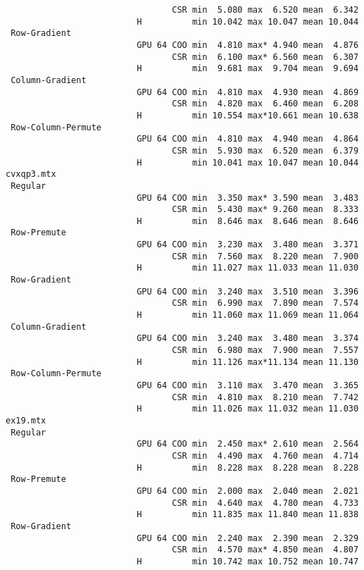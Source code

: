 {\begin{verbatim}
                                 CSR min  5.080 max  6.520 mean  6.342
                          H          min 10.042 max 10.047 mean 10.044
 Row-Gradient
                          GPU 64 COO min  4.810 max* 4.940 mean  4.876
                                 CSR min  6.100 max* 6.560 mean  6.307
                          H          min  9.681 max  9.704 mean  9.694
 Column-Gradient
                          GPU 64 COO min  4.810 max  4.930 mean  4.869
                                 CSR min  4.820 max  6.460 mean  6.208
                          H          min 10.554 max*10.661 mean 10.638
 Row-Column-Permute
                          GPU 64 COO min  4.810 max  4.940 mean  4.864
                                 CSR min  5.930 max  6.520 mean  6.379
                          H          min 10.041 max 10.047 mean 10.044
cvxqp3.mtx
 Regular
                          GPU 64 COO min  3.350 max* 3.590 mean  3.483
                                 CSR min  5.430 max* 9.260 mean  8.333
                          H          min  8.646 max  8.646 mean  8.646
 Row-Premute
                          GPU 64 COO min  3.230 max  3.480 mean  3.371
                                 CSR min  7.560 max  8.220 mean  7.900
                          H          min 11.027 max 11.033 mean 11.030
 Row-Gradient
                          GPU 64 COO min  3.240 max  3.510 mean  3.396
                                 CSR min  6.990 max  7.890 mean  7.574
                          H          min 11.060 max 11.069 mean 11.064
 Column-Gradient
                          GPU 64 COO min  3.240 max  3.480 mean  3.374
                                 CSR min  6.980 max  7.900 mean  7.557
                          H          min 11.126 max*11.134 mean 11.130
 Row-Column-Permute
                          GPU 64 COO min  3.110 max  3.470 mean  3.365
                                 CSR min  4.810 max  8.210 mean  7.742
                          H          min 11.026 max 11.032 mean 11.030
ex19.mtx
 Regular
                          GPU 64 COO min  2.450 max* 2.610 mean  2.564
                                 CSR min  4.490 max  4.760 mean  4.714
                          H          min  8.228 max  8.228 mean  8.228
 Row-Premute
                          GPU 64 COO min  2.000 max  2.040 mean  2.021
                                 CSR min  4.640 max  4.780 mean  4.733
                          H          min 11.835 max 11.840 mean 11.838
 Row-Gradient
                          GPU 64 COO min  2.240 max  2.390 mean  2.329
                                 CSR min  4.570 max* 4.850 mean  4.807
                          H          min 10.742 max 10.752 mean 10.747

\end{verbatim}}
